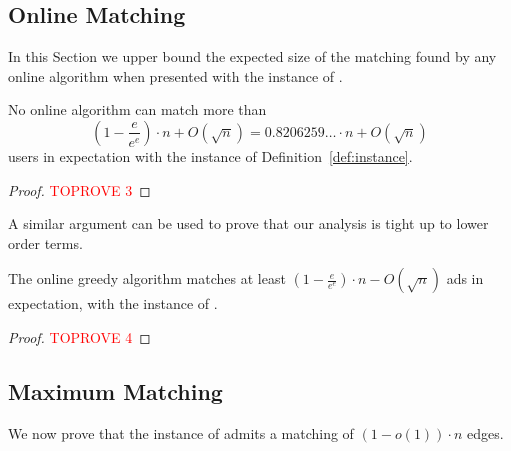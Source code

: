 \documentclass[11pt]{article}
\begin{document}
\subsection{Online Matching}\label{sec:LB:online}
In this Section we upper bound the expected size of the matching found by any online algorithm when presented with the instance of .

\begin{theorem}\label{thm:om}
    No online algorithm can match more than $$\left(1-\frac{e}{e^e}\right) \cdot n + O\left(\sqrt{n}\right) = 0.8206259\ldots \cdot n + O\left(\sqrt{n}\right)$$ users in expectation with the instance of Definition~\ref{def:instance}. \end{theorem}
\begin{proof}\textcolor{red}{TOPROVE 3}\end{proof}
A similar argument can be used  to prove that our analysis is tight up to lower order terms.
\begin{lemmarep}\label{lem:analysis-online-u1-tight}
The online greedy algorithm matches at least $\left(1-\frac{e}{e^e}\right)\cdot n - O(\sqrt{n})$ ads in expectation, with the instance of . \end{lemmarep}
\begin{proof}\textcolor{red}{TOPROVE 4}\end{proof}

\subsection{Maximum Matching}\label{sec:LB:maximum}
We now prove that the instance of  admits a matching of $(1-o(1)) \cdot n$ edges. 
\end{document}

